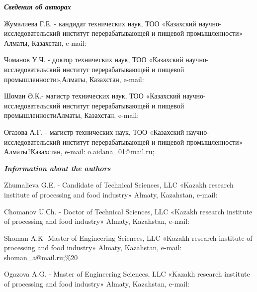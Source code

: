 \emph{{\bfseries Сведения об авторах}}

Жумалиева Г.Е. - кандидат технических наук, ТОО «Казахский
научно-исследовательский институт перерабатывающей и пищевой
промышленности» Алматы, Казахстан, e-mail:

\href{https://orcid.org/0000-0002-5028-465X}{}

Чоманов У.Ч. - доктор технических наук, ТОО «Казахский
научно-исследовательский институт перерабатывающей и пищевой
промышленности»,Алматы, Казахстан, e-mail:

\href{https://orcid.org/0000-0002-5594-8216}{}

Шоман Ә.К.- магистр технических наук, ТОО «Казахский
научно-исследовательский институт перерабатывающей и пищевой
промышленностиАлматы, Казахстан, e-mail: 

Оғазова А.Ғ. - магистр технических наук, ТОО «Казахский
научно-исследовательский институт перерабатывающей и пищевой
промышленности» Алматы?Казахстан, e-mail:
o.aidana\_01@mail.ru;


\emph{{\bfseries Information about the authors}}

Zhumalieva G.E. - Candidate of Technical Sciences, LLC «Kazakh research
institute of processing and food industry» Almaty, Kazahstan, e-mail:

Chomanov U.Сh. - Doctor of Technical Sciences, LLC «Kazakh research
institute of processing and food industry» Almaty, Kazahstan, e-mail:

Shoman A.K- Master of Engineering Sciences, LLC «Kazakh research
institute of processing and food industry» Almaty, Kazahstan, e-mail:
shoman\_a@mail.ru;\%20

Ogazova A.G. - Master of Engineering Sciences, LLC «Kazakh research
institute of processing and food industry» Almaty, Kazahstan, e-mail:\
